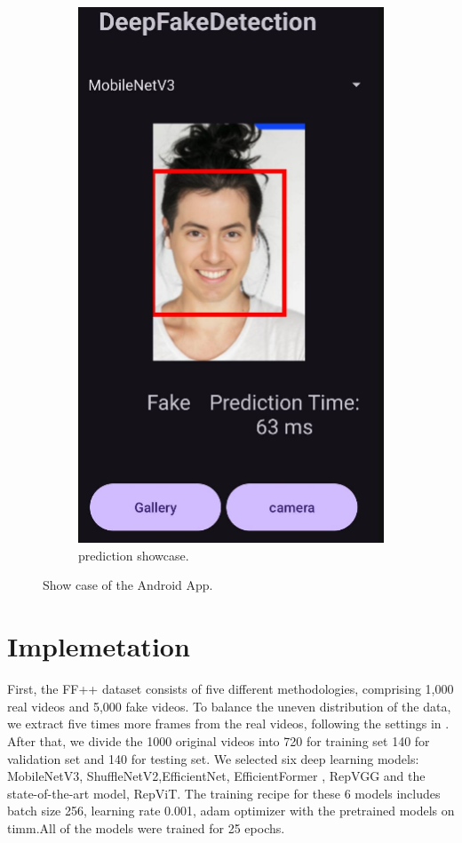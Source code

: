 \documentclass[10pt,twocolumn,letterpaper]{article}
\begin{document}
\begin{figure}
\begin{subfigure}{0.45\linewidth}
    \includegraphics[width=0.75\linewidth]{figure/app_1.png}
    \caption{prediction showcase.}
    \label{fig:f3}
  \end{subfigure}
  \caption{Show case of the Android App.}
  \label{fig:f4}
\end{figure}

\section{Implemetation}
First, the FF++\cite{Rossler_2019_ICCV} dataset consists of five different methodologies, comprising 1,000 real videos and 5,000 fake videos. To balance the uneven distribution of the data, we extract five times more frames from the real videos, following the settings in \cite{qian2020thinking}. After that, we divide the 1000 original videos into 720 for training set 140 for validation set and 140 for testing set.
We selected six deep learning models: MobileNetV3\cite{howard2019searching}, ShuffleNetV2\cite{ma2018shufflenet},EfficientNet\cite{tan2020efficientnet}, EfficientFormer\cite{li2023rethinking} , RepVGG\cite{ding2021repvgg} and the state-of-the-art model, RepViT\cite{wang2024repvit}. The training recipe for these 6 models includes batch size 256, learning rate 0.001, adam optimizer\cite{kingma2017adam} with the pretrained\cite{rw2019timm} models on timm\cite{rw2019timm}.All of the models were trained for 25 epochs.
\end{document}
